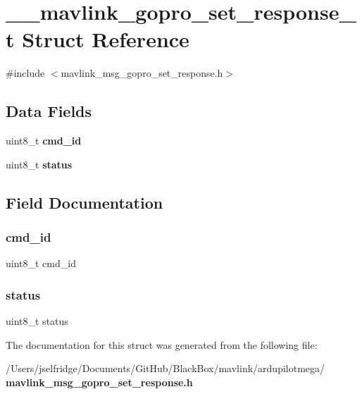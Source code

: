 \section{\+\_\+\+\_\+mavlink\+\_\+gopro\+\_\+set\+\_\+response\+\_\+t Struct Reference}
\label{struct____mavlink__gopro__set__response__t}


{\ttfamily \#include $<$mavlink\+\_\+msg\+\_\+gopro\+\_\+set\+\_\+response.\+h$>$}

\subsection*{Data Fields}
\begin{DoxyCompactItemize}
\item 
uint8\+\_\+t \textbf{ cmd\+\_\+id}
\item 
uint8\+\_\+t \textbf{ status}
\end{DoxyCompactItemize}


\subsection{Field Documentation}
\mbox{\label{struct____mavlink__gopro__set__response__t_a9edc0b39f6faf0153dc2a643d0483e7c}} 
\subsubsection{cmd\+\_\+id}
{\footnotesize\ttfamily uint8\+\_\+t cmd\+\_\+id}

\mbox{\label{struct____mavlink__gopro__set__response__t_ade818037fd6c985038ff29656089758d}} 
\subsubsection{status}
{\footnotesize\ttfamily uint8\+\_\+t status}



The documentation for this struct was generated from the following file\+:\begin{DoxyCompactItemize}
\item 
/\+Users/jselfridge/\+Documents/\+Git\+Hub/\+Black\+Box/mavlink/ardupilotmega/\textbf{ mavlink\+\_\+msg\+\_\+gopro\+\_\+set\+\_\+response.\+h}\end{DoxyCompactItemize}
